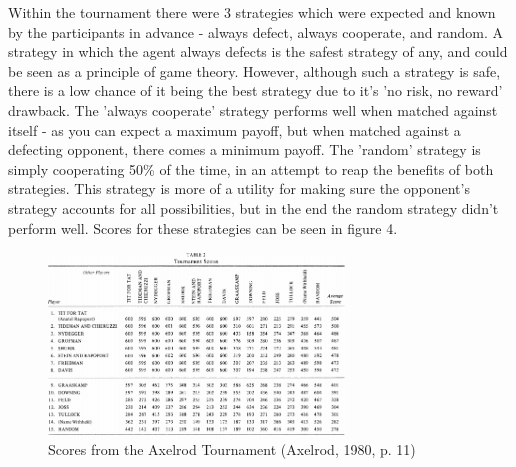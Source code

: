 \documentclass[12pt,a4paper]{article}
\begin{document}
Within the tournament there were 3 strategies which were expected and known by the participants in advance - always defect, always cooperate, and random. A strategy in which the agent always defects is the safest strategy of any, and could be seen as a principle of game theory. However, although such a strategy is safe, there is a low chance of it being the best strategy due to it's 'no risk, no reward' drawback. The 'always cooperate' strategy performs well when matched against itself - as you can expect a maximum payoff, but when matched against a defecting opponent, there comes a minimum payoff. The 'random' strategy is simply cooperating 50\% of the time, in an attempt to reap the benefits of both strategies. This strategy is more of a utility for making sure the opponent's strategy accounts for all possibilities, but in the end the random strategy didn't perform well. Scores for these strategies can be seen in figure 4.

\begin{figure}[H]
	\centering
		\includegraphics[width=0.7\textwidth]{AxelrodTournamentScores}
		\caption{Scores from the Axelrod Tournament (Axelrod, 1980, p. 11)}
\end{figure}
\end{document}
